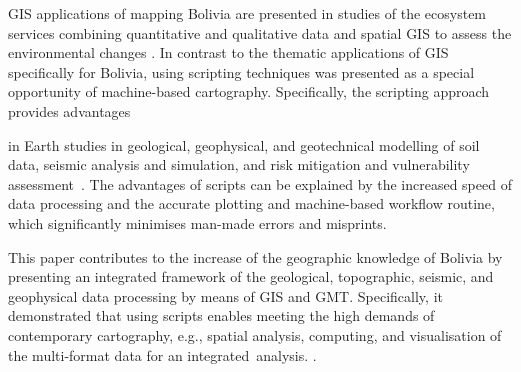 \documentclass[data,article,accept,pdftex,moreauthors]{Definitions/mdpi}
\begin{document}
 GIS applications {of} mapping Bolivia are presented in studies of {the} ecosystem services combining quantitative and qualitative data and spatial GIS {to} assess {the} environmental changes \cite{Hinojosa}. In contrast to {the} thematic applications of GIS {specifically for} Bolivia, using scripting techniques {was} presented {as a special opportunity} of {machine-based} cartography. Specifically, the scripting approach provides advantages {in Earth studies in geological, geophysical, and geotechnical modelling of soil data, seismic analysis and simulation, and risk mitigation and vulnerability \mbox{assessment~\cite{Falcone,Lindh2021b,Chang,Fayjaloun,Petersen}}. {The advantages of scripts can be explained by} the increased speed of {data processing} and the accurate {plotting} and machine-based {workflow} routine, which {significantly} minimises man-made errors and misprints. 

This paper contributes to the {increase} of {the} geographic knowledge of Bolivia by {presenting} an integrated framework {of} the geological, topographic, seismic, and geophysical data {processing} by means of GIS and GMT{. }Specifically, it demonstrated that using scripts enables meeting {the} high demands of contemporary cartography, e.g.{,} spatial {analysis, computing, and} visualisation of {the} multi-format data for an \mbox{integrated analysis}. .

\vspace{6pt} 

\funding{\hl{ } %
}%

}
\end{document}
